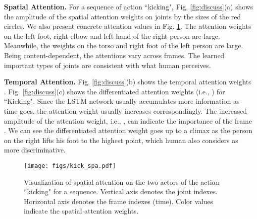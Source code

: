 \documentclass[letterpaper]{article}
\begin{document}
\begin{comment}
\begin{figure}[th]
	\vspace{-3mm}
	\begin{center}
		\texttt{[image: figs/vis\_tem.png]}
	\end{center}
	\vspace{-4mm}
	\caption{Visualization of spatial and temporal attention weights of ``Kicking" (top) and ``Pushing" (bottom). (a) to (f) show the spatial attention weights (marked by green circles, the larger of the circle, the higher of the attention intensity) on those frames. The right figure shows the temporal attention weights as the action proceeds. Best viewed in color.}
	\label{fig:discuss}
	\vspace{0mm}	
\end{figure}
\end{comment}




\textbf{Spatial Attention.} For a sequence of action ``kicking", Fig. \ref{fig:discuss}(a) shows the amplitude of the spatial attention weights on joints by the sizes of the red circles. We also present concrete attention values in Fig. \ref{fig:spa_att_vis}. The attention weights on the left foot, right elbow and left hand of the right person are large. Meanwhile, the weights on the torso and right foot of the left person are large. Being content-dependent, the attentions vary across frames. The learned important types of joints are consistent with what human perceives.


\textbf{Temporal Attention.} Fig. \ref{fig:discuss}(b) shows the temporal attention weights . Fig. \ref{fig:discuss}(c) shows the differentiated attention weights (i.e., ) for ``Kicking". Since the LSTM network usually accumulates more information as time goes, the attention weight usually increases correspondingly. The increased amplitude of the attention weight, i.e., , can indicate the importance of the frame . We can see the differentiated attention weight goes up to a climax as the person on the right lifts his foot to the highest point, which human also considers as more discriminative.

\begin{figure}[t]
	\begin{center}
		\texttt{[image: figs/kick\_spa.pdf]}
\vspace{-4mm}
	\end{center}
\caption{Visualization of spatial attention on the two actors of the action ``kicking" for a sequence. Vertical axis denotes the joint indexes. Horizontal axis denotes the frame indexes (time). Color values indicate the spatial attention weights.}
\label{fig:spa_att_vis}
\vspace{1mm}
\end{figure}
\end{document}
